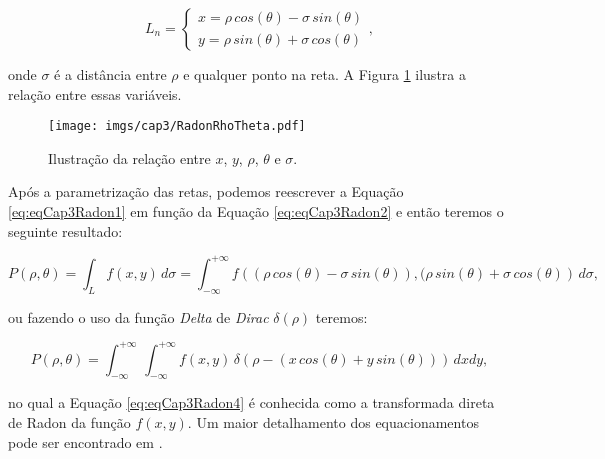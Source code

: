 \begin{equation} 
L_{n} = 
\begin{cases}
x = \rho \, cos(\theta) - \sigma \, sin(\theta)\\ 
y = \rho \, sin(\theta) + \sigma \, cos(\theta)
\end{cases},
\label{eq:eqCap3Radon2}
\end{equation}

\noindent onde $\sigma$ é a distância entre $\rho$ e qualquer ponto na reta. A Figura \ref{fig:imgCap3RadonRhoTheta} ilustra a relação entre essas variáveis.

\begin{figure}[H]
	\caption{Ilustração da relação entre $x$, $y$, $\rho$, $\theta$ e $\sigma$.}
	\begin{center}
		\texttt{[image: imgs/cap3/RadonRhoTheta.pdf]}
	\end{center}
	\label{fig:imgCap3RadonRhoTheta}
\end{figure}

Após a parametrização das retas, podemos reescrever a Equação \ref{eq:eqCap3Radon1} em função da Equação \ref{eq:eqCap3Radon2} e então teremos o seguinte resultado:

\begin{equation} 
P(\rho,\theta) = \int_{L}^{} f(x,y) \, d\sigma = {\int_{-\infty}^{+\infty} f\left((\rho \, cos(\theta) - \sigma \, sin(\theta)),(\rho \, sin(\theta) + \sigma \, cos(\theta)\right) \, d\sigma},
\label{eq:eqCap3Radon3}
\end{equation}

\noindent ou fazendo o uso da função \textit{Delta} de \textit{Dirac} $\delta(\rho)$ teremos:

\begin{equation} 
P(\rho,\theta) = {\int_{-\infty}^{+\infty} \, \int_{-\infty}^{+\infty} f(x,y) \, \delta(\rho - (x\,cos(\theta)+y\,sin(\theta)))  \, dxdy},
\label{eq:eqCap3Radon4}
\end{equation} 

\noindent no qual a Equação \ref{eq:eqCap3Radon4} é conhecida como a transformada direta de Radon da função $f(x,y)$. Um maior detalhamento dos equacionamentos pode ser encontrado em .

